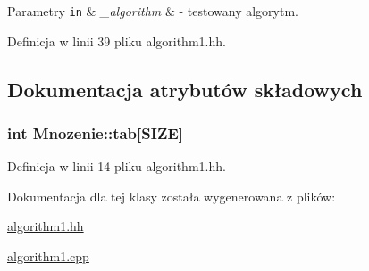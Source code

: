 \begin{DoxyParams}[1]{Parametry}
\mbox{\tt in}  & {\em \-\_\-algorithm} & -\/ testowany algorytm. \\
\hline
\end{DoxyParams}


Definicja w linii 39 pliku algorithm1.\-hh.



\subsection{Dokumentacja atrybutów składowych}
\hypertarget{class_mnozenie_a6dc67671f84a557d97c322b8af528359}{
\subsubsection[{tab}]{\setlength{\rightskip}{0pt plus 5cm}int Mnozenie\-::tab\mbox{[}{\bf S\-I\-Z\-E}\mbox{]}\hspace{0.3cm}{\ttfamily [private]}}}\label{class_mnozenie_a6dc67671f84a557d97c322b8af528359}


Definicja w linii 14 pliku algorithm1.\-hh.



Dokumentacja dla tej klasy została wygenerowana z plików\-:\begin{DoxyCompactItemize}
\item 
\hyperlink{algorithm1_8hh}{algorithm1.\-hh}\item 
\hyperlink{algorithm1_8cpp}{algorithm1.\-cpp}\end{DoxyCompactItemize}
